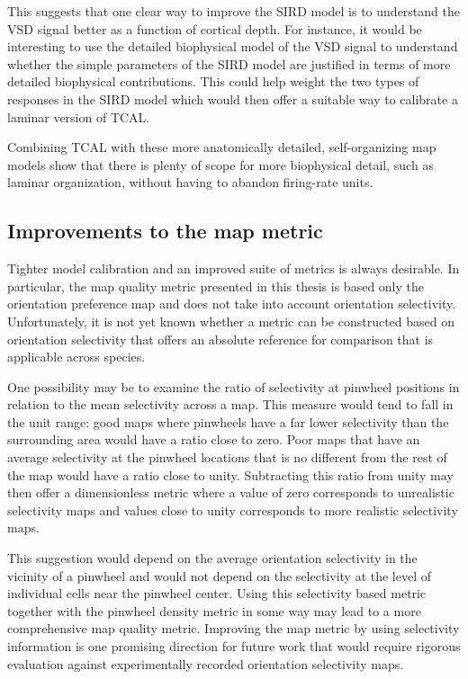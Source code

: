 \documentclass[phd,ianc,twoside]{infthesis}
\begin{document}
This suggests that one clear way to improve the SIRD model is to
understand the VSD signal better as a function of cortical depth. For
instance, it would be interesting to use the detailed biophysical model
of the VSD signal \citep{chemla_neuroimage10} to understand whether the
simple parameters of the SIRD model are justified in terms of more
detailed biophysical contributions. This could help weight the two types
of responses in the SIRD model which would then offer a suitable way to
calibrate a laminar version of TCAL.

Combining TCAL with these more anatomically detailed, self-organizing
map models show that there is plenty of scope for more biophysical
detail, such as laminar organization, without having to abandon
firing-rate units.

\subsection{Improvements to the map metric}

Tighter model calibration and an improved suite of metrics is always
desirable. In particular, the map quality metric presented in this
thesis is based only the orientation preference map and does not take
into account orientation selectivity. Unfortunately, it is not yet known
whether a metric can be constructed based on orientation
selectivity that offers an absolute reference for comparison that is
applicable across species.

One possibility may be to examine the ratio of selectivity at pinwheel
positions in relation to the mean selectivity across a map. This measure
would tend to fall in the unit range: good maps where pinwheels have a
far lower selectivity than the surrounding area would have a ratio close to
zero. Poor maps that have an average selectivity at the pinwheel locations that is no
different from the rest of the map would have a ratio close to
unity. Subtracting this ratio from unity may then offer a dimensionless
metric where a value of zero corresponds to unrealistic selectivity maps
and values close to unity corresponds to more realistic selectivity maps.

This suggestion would depend on the average orientation selectivity in
the vicinity of a pinwheel and would not depend on the selectivity at
the level of individual cells near the pinwheel center. Using this
selectivity based metric together with the pinwheel density metric in
some way may lead to a more comprehensive map quality metric. Improving
the map metric by using selectivity information is one promising direction for future work that would require rigorous
evaluation against experimentally recorded orientation selectivity maps.
\end{document}
